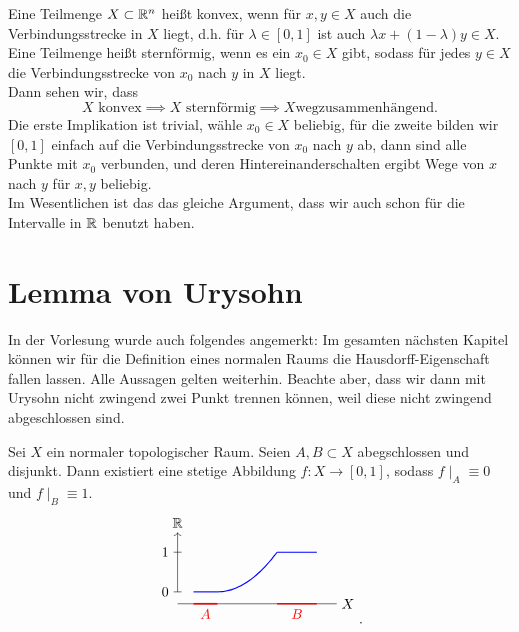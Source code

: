 \begin{dexample}
    Eine Teilmenge $X\subset \mathbb{R}^n$ heißt konvex, wenn für $x,y\in X$ auch die Verbindungsstrecke in $X$ liegt, d.h. für  $λ\in [0,1]$ ist auch $λx + (1-λ)y \in X$. Eine Teilmenge heißt sternförmig, wenn es ein $x_0\in X$ gibt, sodass für jedes $y\in X$ die Verbindungsstrecke von $x_0$ nach $y$ in  $X$ liegt. \\
    Dann sehen wir, dass
    \[
    X \text{ konvex}\implies X \text{ sternförmig} \implies X \text{wegzusammenhängend}
    .\] 
    Die erste Implikation ist trivial, wähle $x_0\in X$ beliebig, für die zweite bilden wir $[0,1]$ einfach auf die Verbindungsstrecke von  $x_0$ nach $y$ ab, dann sind alle Punkte mit  $x_0$ verbunden, und deren Hintereinanderschalten ergibt Wege von $x$ nach  $y$ für  $x,y$ beliebig. \\
    Im Wesentlichen ist das das gleiche Argument, dass wir auch schon für die Intervalle in $\mathbb{R}$ benutzt haben.
\end{dexample}

\section{Lemma von Urysohn}
\begin{dremark}
    In der Vorlesung wurde auch folgendes angemerkt: Im gesamten nächsten Kapitel können wir für die Definition eines normalen Raums die Hausdorff-Eigenschaft fallen lassen. Alle Aussagen gelten weiterhin. Beachte aber, dass wir dann mit Urysohn nicht zwingend zwei Punkt trennen können, weil diese nicht zwingend abgeschlossen sind.
\end{dremark}

\begin{theorem}\label{thm:urysohn}
    Sei $X$ ein normaler topologischer Raum. Seien  $A,B\subset X$ abegschlossen und disjunkt. Dann existiert eine stetige Abbildung $f: X \to  [0,1]$, sodass $f\mid _A \equiv 0 $ und $f\mid _{B} \equiv  1$.
    \[
\begin{tikzpicture}
    \draw (0,-0.3) -- (4,-0.3) node[anchor=west] {$X$};
    \draw[red,very thick] (0.4,-0.3) -- (1, -0.3) node[midway, anchor = north] {$A$};
    \draw[red, very thick] (2.5,-0.3) -- (3.5, -0.3) node[midway, anchor = north] {$B$};
    \draw[->] (0,0) -- (0,1.5) node[anchor=south] {$\R$};
    \draw (-0.1,0) node[anchor = east] {$0$}-- (0.1,0);
    \draw (-0.1,1) node[anchor=east] {$1$}-- (0.1,1);
    \draw[blue, thick] (0.4,0)-- (1,0);
    \draw[blue, thick] (2.5,1) -- (3.5,1);
    \draw[blue, thick, smooth, domain = 1:2.5,variable=\x] plot ({\x},{(\x-1)^2/2.25});
\end{tikzpicture}
    .\] 
\end{theorem}


